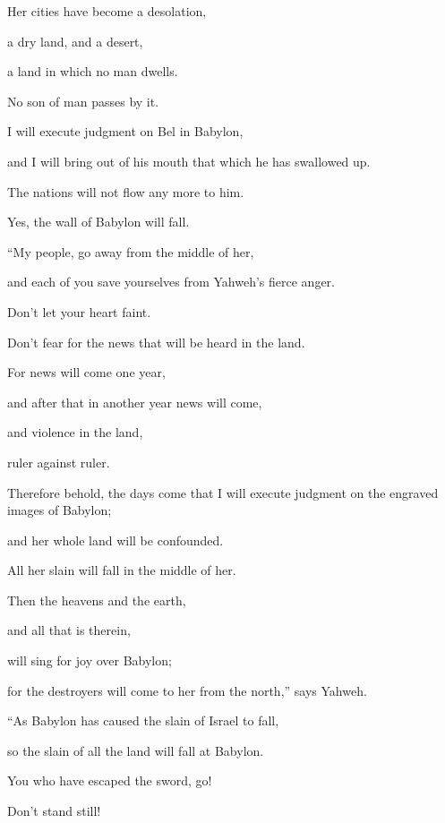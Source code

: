 {\par }{\Q {}Her cities have become a desolation,
\par }{\QB a dry land, and a desert,
\par }{\QB a land in which no man dwells.
\par }{\QB No son of man passes by it.
\par }{\Q {}I will execute judgment on Bel in Babylon,
\par }{\QB and I will bring out of his mouth that which he has swallowed up.
\par }{\Q The nations will not flow any more to him.
\par }{\QB Yes, the wall of Babylon will fall.
\par }{\BB \par }{\Q {}“My people, go away from the middle of her,
\par }{\QB and each of you save yourselves from Yahweh’s fierce anger.
\par }{\Q {}Don’t let your heart faint.
\par }{\QB Don’t fear for the news that will be heard in the land.
\par }{\Q For news will come one year,
\par }{\QB and after that in another year news will come,
\par }{\QB and violence in the land,
\par }{\QB ruler against ruler.
\par }{\Q {}Therefore behold, the days come that I will execute judgment on the engraved images of Babylon;
\par }{\QB and her whole land will be confounded.
\par }{\QB All her slain will fall in the middle of her.
\par }{\Q {}Then the heavens and the earth,
\par }{\QB and all that is therein,
\par }{\Q will sing for joy over Babylon;
\par }{\QB for the destroyers will come to her from the north,” says Yahweh.
\par }{\BB \par }{\Q {}“As Babylon has caused the slain of Israel to fall,
\par }{\QB so the slain of all the land will fall at Babylon.
\par }{\Q {}You who have escaped the sword, go!
\par }{\QB Don’t stand still!
}
